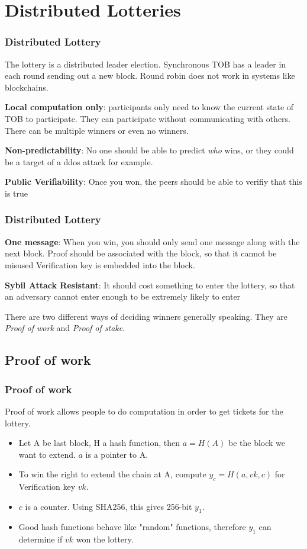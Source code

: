 \section{Distributed Lotteries}
        \begin{frame}
            \frametitle{Distributed Lottery}
                The lottery is a distributed leader election. Synchronous TOB has a leader in each round sending out a new block. Round robin does not work in systems like blockchains. 
                
                \textbf{Local computation only}: participants only need to know the current state of TOB to participate. They can participate without communicating with others. There can be multiple winners or even no winners.
            
                \textbf{Non-predictability}: No one should be able to predict \textit{who} wins, or they could be a target of a ddos attack for example.

                \textbf{Public Verifiability}: Once you won, the peers should be able to verifiy that this is true
        \end{frame}

        \begin{frame}
            \frametitle{Distributed Lottery}
                \textbf{One message}: When you win, you should only send one message along with the next block. Proof should be associated with the block, so that it cannot be misused Verification key is embedded into the block. 
                
                \textbf{Sybil Attack Resistant}: It should cost something to enter the lottery, so that an adversary cannot enter enough to be extremely likely to enter
        
                There are two different ways of deciding winners generally speaking. They are \textit{Proof of work} and \textit{Proof of stake}. 

        \end{frame}
    \subsection{Proof of work}
    \begin{frame}
        \frametitle{Proof of work}
        Proof of work allows people to do computation in order to get tickets for the lottery.
            \begin{itemize}
                \item  Let A be last block, H a hash function, then $a = H(A)$ be the block we want to extend. $a$ is a pointer to A.
                \item To win the right to extend the chain at A, compute $y_c = H(a, vk, c)$ for Verification key $vk$.
                \item $c$ is a counter. Using SHA256, this gives 256-bit $y_1$. 
                \item Good hash functions behave like "random" functions, therefore $y_1$ can determine if $vk$ won the lottery. 
            \end{itemize}         
    \end{frame}

